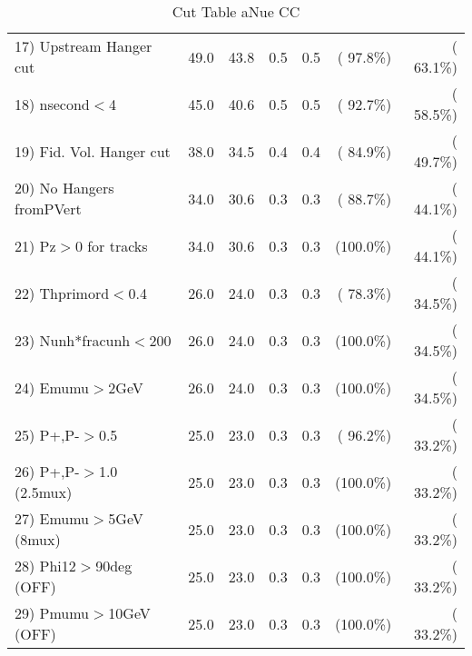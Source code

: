 \begin{table}[h!]
\begin{tabular}{||l||r|r|r|r|r|r||}
 17) Upstream Hanger cut  &         49.0 &         43.8 &          0.5 &          0.5 & ( 97.8\%) & ( 63.1\%) \\
 18) nsecond$<$4          &         45.0 &         40.6 &          0.5 &          0.5 & ( 92.7\%) & ( 58.5\%) \\
 19) Fid. Vol. Hanger cut &         38.0 &         34.5 &          0.4 &          0.4 & ( 84.9\%) & ( 49.7\%) \\
 20) No Hangers fromPVert &         34.0 &         30.6 &          0.3 &          0.3 & ( 88.7\%) & ( 44.1\%) \\
 21) Pz$>$0 for tracks    &         34.0 &         30.6 &          0.3 &          0.3 & (100.0\%) & ( 44.1\%) \\
 22) Thprimord$<$0.4      &         26.0 &         24.0 &          0.3 &          0.3 & ( 78.3\%) & ( 34.5\%) \\
 23) Nunh*fracunh$<$200   &         26.0 &         24.0 &          0.3 &          0.3 & (100.0\%) & ( 34.5\%) \\
 24) Emumu$>$2GeV         &         26.0 &         24.0 &          0.3 &          0.3 & (100.0\%) & ( 34.5\%) \\
 25) P+,P-$>$0.5          &         25.0 &         23.0 &          0.3 &          0.3 & ( 96.2\%) & ( 33.2\%) \\
 26) P+,P-$>$1.0 (2.5mux) &         25.0 &         23.0 &          0.3 &          0.3 & (100.0\%) & ( 33.2\%) \\
 27) Emumu$>$5GeV  (8mux) &         25.0 &         23.0 &          0.3 &          0.3 & (100.0\%) & ( 33.2\%) \\
 28) Phi12$>$90deg  (OFF) &         25.0 &         23.0 &          0.3 &          0.3 & (100.0\%) & ( 33.2\%) \\
 29) Pmumu$>$10GeV  (OFF) &         25.0 &         23.0 &          0.3 &          0.3 & (100.0\%) & ( 33.2\%) \\
 \hline
 \hline
 \end{tabular}
 \caption{Cut Table  aNue CC  }
 \label{tab-cutcohjpsi-mumu_anuecc}
 \end{table}
